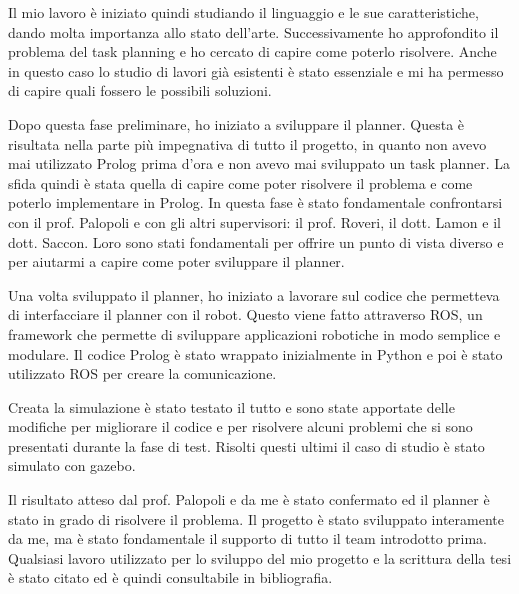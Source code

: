 Il mio lavoro è iniziato quindi studiando il linguaggio e le sue caratteristiche, dando molta importanza allo stato dell'arte. 
Successivamente ho approfondito il problema del task planning e ho cercato di capire come poterlo risolvere. Anche in questo caso lo studio di lavori già esistenti è stato essenziale e mi ha permesso di capire quali fossero le possibili soluzioni.

Dopo questa fase preliminare, ho iniziato a sviluppare il planner. Questa è risultata nella parte più impegnativa di tutto il progetto, in quanto non avevo mai utilizzato Prolog prima d'ora e non avevo mai sviluppato un task planner.
La sfida quindi è stata quella di capire come poter risolvere il problema e come poterlo implementare in Prolog. In questa fase è stato fondamentale confrontarsi con il prof. Palopoli e con gli altri supervisori: il prof. Roveri, il dott. Lamon e il dott. Saccon.
Loro sono stati fondamentali per offrire un punto di vista diverso e per aiutarmi a capire come poter sviluppare il planner. 

Una volta sviluppato il planner, ho iniziato a lavorare sul codice che permetteva di interfacciare il planner con il robot. Questo viene fatto attraverso ROS, un framework che permette di sviluppare applicazioni robotiche in modo semplice e modulare.
Il codice Prolog è stato wrappato inizialmente in Python e poi è stato utilizzato ROS per creare la comunicazione.

Creata la simulazione è stato testato il tutto e sono state apportate delle modifiche per migliorare il codice e per risolvere alcuni problemi che si sono presentati durante la fase di test. 
Risolti questi ultimi il caso di studio è stato simulato con gazebo. 

Il risultato atteso dal prof. Palopoli e da me è stato confermato ed il planner è stato in grado di risolvere il problema. 
Il progetto è stato sviluppato interamente da me, ma è stato fondamentale il supporto di tutto il team introdotto prima. 
Qualsiasi lavoro utilizzato per lo sviluppo del mio progetto e la scrittura della tesi è stato citato ed è quindi consultabile in bibliografia.

